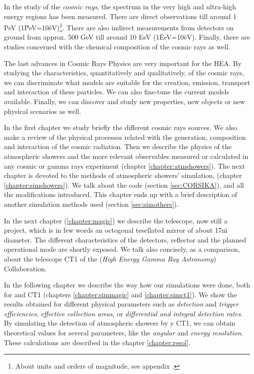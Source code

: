 In the study of the {\itshape cosmic rays}, the spectrum in the very
high and ultra-high energy regions has been measured. There are direct
observations till around 1 PeV
(1\u{PeV}=10\u{eV})\footnote{About units and orders of
  magnitude, see appendix .}. There are also
indirect measurements from detectors on ground from approx. 500 GeV
till around 10 EeV (1\u{EeV}=10\u{eV}). Finally, there are
studies concerned with the chemical composition of the cosmic rays as
well.

The last advances in Cosmic Rays Physics are very important for the
HEA. By studying the characteristics, quantitatively and
qualitatively, of the cosmic rays, we can discriminate what models are
suitable for the creation, emission, transport and interaction of
these particles. We can also fine-tune the current models available.
Finally, we can discover and study new properties, new objects or new
physical scenarios as well.

In the first chapter we study briefly the different cosmic rays
sources. We also make a review of the physical processes related with
the generation, composition and interaction of the cosmic radiation.
Then we describe the physics of the atmospheric showers and the more
relevant observables measured or calculated in any cosmic or gamma
rays experiment (chapter \ref{chapter:atmshowers}). The next chapter
is devoted to the methods of atmospheric showers' simulation, (chapter
\ref{chapter:simshowers}).  We talk about the \CORSIKA code (section
\ref{sec:CORSIKA}), and all the modifications introduced. This chapter
ends up with a brief description of another simulation methods used
(section \ref{sec:simothers}).

In the next chapter (\ref{chapter:magic}) we describe the \MAGIC
telescope, now still a project, which is in few words an octogonal
tesellated mirror of about 17\u{m} diameter. The different
characteristics of the detectors, reflector and the planned
operational mode are shortly exposed. We talk also concisely, as a
comparison, about the telescope CT1 of the \HEGRA ({\itshape High
  Energy Gamma Ray Astronomy}) Collaboration.

In the following chapter we describe the way how our simulations were
done, both for \MAGIC and CT1 (chapters \ref{chapter:simmagic} and
\ref{chapter:simct1}). We show the results obtained for different
physical parameters such as \emph{detection} and \emph{trigger
  efficiencies}, \emph{effective collection areas}, or
\emph{differential and integral detection rates}. By simulating the
detection of atmospheric showers by \MAGIC y CT1, we can obtain
theoretical values for several parameters, like the \emph{angular} and
\emph{energy resolution}. These calculations are described in the
chapter \ref{chapter:resol}.

